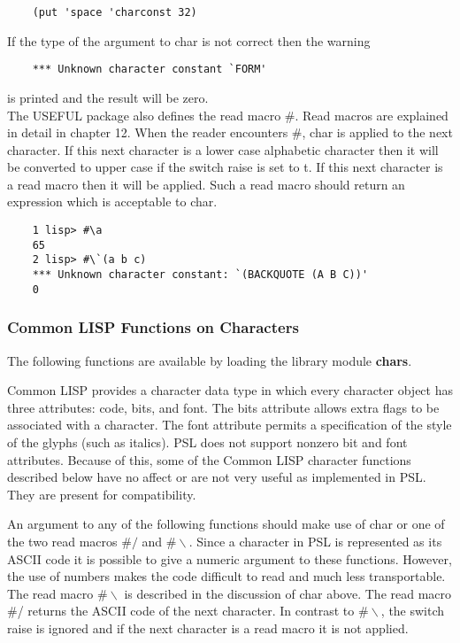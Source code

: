 \begin{verbatim}
    (put 'space 'charconst 32)
\end{verbatim}

    If the type of the argument to char is not correct then  the
    warning

\begin{verbatim}
    *** Unknown character constant `FORM'
\end{verbatim}
    is printed and the result will be zero.\\

    The  USEFUL  package  also  defines the read macro \#. Read
				macros are explained in detail in  chapter  12. When  the
    reader encounters \#, char is applied to the next character. 
				If  this next character is a lower case alphabetic character
    then it will be converted to upper case if the switch  raise
    is set to t.  If this next character is a read macro then it
    will  be  applied.   Such  a  read  macro  should  return an
    expression which is acceptable to char.

\begin{verbatim}
    1 lisp> #\a
    65
    2 lisp> #\`(a b c)
    *** Unknown character constant: `(BACKQUOTE (A B C))'
    0
\end{verbatim}
\subsubsection{Common LISP Functions on Characters}

  The following functions are available by loading  the  library
module {\bf chars}.

  Common  LISP  provides  a  character  data type in which every
character object has three attributes:  code,  bits,  and  font.
The  bits  attribute  allows extra flags to be associated with a
character.  The font attribute permits a  specification  of  the
style  of  the  glyphs  (such as italics).  PSL does not support
nonzero bit and font attributes.  Because of this, some  of  the
Common  LISP  character functions described below have no affect
or are not very useful as implemented in PSL.  They are  present
for compatibility.

  An  argument to any of the following functions should make use
of char or one of the two read  macros  $\#/$  and 
$\#\backslash$.    Since  a character in PSL is represented as its
ASCII code it is possible to give a numeric argument to these
functions.  However, the use of  numbers  makes  the  code 
difficult  to  read and much less transportable.  The read macro
$\#\backslash$ is described in the discussion of char above.  The
read macro \#/ returns the ASCII code of  the next  character. 
In contrast to
$\#\backslash$, the switch raise is ignored and if the next character is a read
macro it is not applied.

